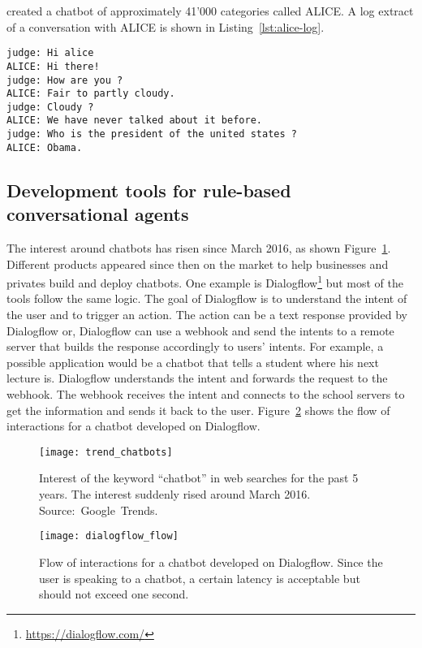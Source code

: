 \citet{wallace2009anatomy} created a chatbot of approximately 41'000 categories called ALICE. A log extract of a conversation with ALICE is shown in Listing~\ref{lst:alice-log}.
\begin{lstlisting}[label={lst:alice-log}]
judge: Hi alice
ALICE: Hi there!
judge: How are you ?
ALICE: Fair to partly cloudy.
judge: Cloudy ?
ALICE: We have never talked about it before.
judge: Who is the president of the united states ?
ALICE: Obama.
\end{lstlisting}

\subsection{Development tools for rule-based conversational agents}
The interest around chatbots has risen since March 2016, as shown Figure~\ref{fig:trend_chatbot}. Different products appeared since then on the market to help businesses and privates build and deploy chatbots. One example is Dialogflow\footnote{\url{https://dialogflow.com/}} but most of the tools follow the same logic. The goal of Dialogflow is to understand the intent of the user and to trigger an action. The action can be a text response provided by Dialogflow or, Dialogflow can use a webhook and send the intents to a remote server that builds the response accordingly to users' intents.
For example, a possible application would be a chatbot that tells a student where his next lecture is. Dialogflow understands the intent and forwards the request to the webhook. The webhook receives the intent and connects to the school servers to get the information and sends it back to the user. Figure~\ref{fig:dialogflow} shows the flow of interactions for a chatbot developed on Dialogflow.

\begin{figure}[b]
    \centering
    \texttt{[image: trend\_chatbots]}
    \decoRule
    \caption[Web search interest for ``chatbot'']{Interest of the keyword ``chatbot'' in web searches for the past 5 years. The interest suddenly rised around March 2016. Source:~Google~Trends.}
    \label{fig:trend_chatbot}
\end{figure}

\begin{figure}
    \centering
    \texttt{[image: dialogflow\_flow]}
    \decoRule
    \caption[Dialogflow based chatbot]{Flow of interactions for a chatbot developed on Dialogflow. Since the user is speaking to a chatbot, a certain latency is acceptable but should not exceed one second.}
    \label{fig:dialogflow}
\end{figure}

